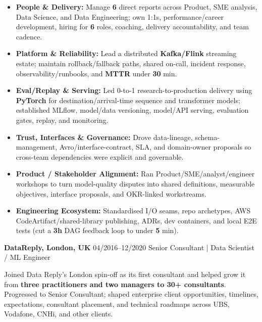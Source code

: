 \documentclass[]{../../../../friggeri-cv}
\renewcommand{\entry}[4]{%
  \parbox[t]{\dimexpr\textwidth-\entryleftinset\relax}{%
    \textbf{#2}%
    {\footnotesize\addfontfeature{Color=lightgray}\hspace{0.6em}#1}%
    \hfill%
    {\small\color{textcolor} #3}\\%
    #4\vspace{\parsep}%
  }\\}
\begin{document}
\begin{entrylist}
{{        }
        \begin{itemize}[leftmargin=1.1em]
            \item \normalsize\textbf{People \& Delivery:} Manage \textbf{6} direct reports across Product, SME analysis, Data Science, and Data Engineering; own 1:1s, performance/career development, hiring for \textbf{6} roles, coaching, delivery accountability, and team cadence.
            \item \normalsize\textbf{Platform \& Reliability:} Lead a distributed \textbf{Kafka/Flink} streaming estate; maintain rollback/fallback paths, shared on-call, incident response, observability/runbooks, and \textbf{MTTR} under \textbf{30} min.
            \item \normalsize\textbf{Eval/Replay \& Serving:} Led 0-to-1 research-to-production delivery using \textbf{PyTorch} for destination/arrival-time sequence and transformer models; established ML{f}low, model/data versioning, model/API serving, evaluation gates, replay, and monitoring.
            \item \normalsize\textbf{Trust, Interfaces \& Governance:} Drove data-lineage, schema-management, Avro/interface-contract, SLA, and domain-owner proposals so cross-team dependencies were explicit and governable.
            \item \normalsize\textbf{Product / Stakeholder Alignment:} Ran Product/SME/analyst/engineer workshops to turn model-quality disputes into shared definitions, measurable objectives, interface proposals, and OKR-linked workstreams.
            \item \normalsize\textbf{Engineering Ecosystem:} Standardised I/O seams, repo archetypes, AWS CodeArtifact/shared-library publishing, ADRs, dev containers, and local E2E tests (cut a \textbf{3h} DAG feedback loop to under \textbf{5} min).
        \end{itemize}
    }
    \entry
    {04/2016--12/2020}
    {DataReply, London, UK}
    {Senior Consultant | Data Scientist / ML Engineer}
    {
        {\normalsize
        \setlength{\parindent}{0pt}
        \setlength{\leftskip}{0pt}
        Joined Data Reply's London spin-off as its first consultant and helped grow it from \textbf{three practitioners and two managers to 30+ consultants}. Progressed to Senior Consultant; shaped enterprise client opportunities, timelines, expectations, consultant placement, and technical roadmaps across UBS, Vodafone, CNHi, and other clients.

}}
\end{entrylist}
\end{document}
